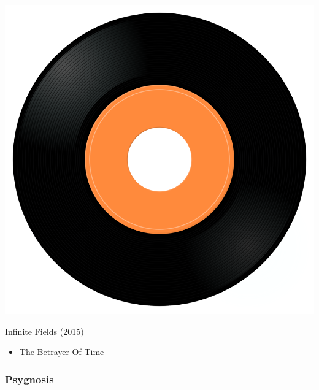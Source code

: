 \begin{minipage}[t]{0.25\textwidth}\vspace{0pt}
\captionsetup{type=figure}
\includegraphics[width=\textwidth]{Images/cover.png}
\caption*{Infinite Fields (2015)}
\end{minipage}
\begin{minipage}[t]{0.25\textwidth}\vspace{0pt}
\begin{itemize}[nosep,leftmargin=1em,labelwidth=*,align=left]
	\setlength{\itemsep}{0pt}
	\item The Betrayer Of Time
\end{itemize}
\end{minipage}

\subsubsection{Psygnosis}


